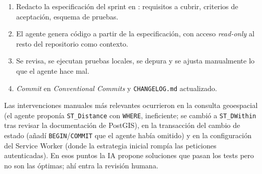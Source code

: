\begin{enumerate}
  \item Redacto la especificación del sprint en : requisitos a cubrir, criterios de aceptación, esquema de pruebas.
  \item El agente genera código a partir de la especificación, con acceso \textit{read-only} al resto del repositorio como contexto.
  \item Se revisa, se ejecutan pruebas locales, se depura y se ajusta manualmente lo que el agente hace mal.
  \item \textit{Commit} en \textit{Conventional Commits} y \texttt{CHANGELOG.md} actualizado.
\end{enumerate}

Las intervenciones manuales más relevantes ocurrieron en la consulta geoespacial (el agente proponía \texttt{ST\_Distance} con \texttt{WHERE}, ineficiente; se cambió a \texttt{ST\_DWithin} tras revisar la documentación de PostGIS), en la transacción del cambio de estado (añadí \texttt{BEGIN}/\texttt{COMMIT} que el agente había omitido) y en la configuración del Service Worker (donde la estrategia inicial rompía las peticiones autenticadas). En esos puntos la IA propone soluciones que pasan los tests pero no son las óptimas; ahí entra la revisión humana.
